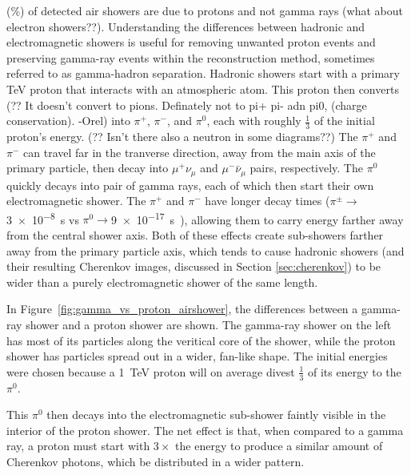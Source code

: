   (\%) of detected air showers are due to {\color{red}protons and not gamma rays (what about electron showers??)}.
  Understanding the differences between hadronic and electromagnetic showers is useful for removing unwanted proton events and preserving gamma-ray events within the reconstruction method, sometimes referred to as gamma-hadron separation.
  Hadronic showers start with a primary \nicetilde TeV proton that interacts with an atmospheric atom.
  {\color{red}This proton then converts (?? It doesn't convert to pions. Definately not to pi+ pi- adn pi0, (charge conservation). -Orel)} into $\pi^{+}$, $\pi^{-}$, and $\pi^{0}$, each with roughly \nicetilde $\frac{1}{3}$ of the initial proton's energy.
  {\color{red}(?? Isn't there also a neutron in some diagrams??)}
  The $\pi^{+}$ and $\pi^{-}$ can travel far in the tranverse direction, away from the main axis of the primary particle, then decay into $\mu^{+}\nu_{\mu}$ and $\mu^{-}\bar{\nu}_{\mu}$ pairs, respectively.
  The $\pi^{0}$ quickly decays into pair of gamma rays, each of which then start their own electromagnetic shower.
  The $\pi^{+}$ and $\pi^{-}$ have longer decay times ($\pi^{\pm} \rightarrow $\SI{3e-8}{s} vs $\pi^{0} \rightarrow $\SI{9e-17}{s}~\cite{pdg_2014}), allowing them to carry energy farther away from the central shower axis.
  Both of these effects create sub-showers farther away from the primary particle axis, which tends to cause hadronic showers (and their resulting Cherenkov images, discussed in Section \ref{sec:cherenkov}) to be wider than a purely electromagnetic shower of the same length. 
  
  In Figure~\ref{fig:gamma_vs_proton_airshower}, the differences between a gamma-ray shower and a proton shower are shown.
  The gamma-ray shower on the left has most of its particles along the veritical core of the shower, while the proton shower has particles spread out in a wider, fan-like shape.
  The initial energies were chosen because a \SI{1}{TeV} proton will on average divest $\frac{1}{3}$ of its energy to the $\pi^{0}$.

  This $\pi^{0}$ then decays into the electromagnetic sub-shower faintly visible in the interior of the proton shower.
  The net effect is that, when compared to a gamma ray, a proton must start with $3\times$ the energy to produce a similar amount of Cherenkov photons, which be distributed in a wider pattern.

